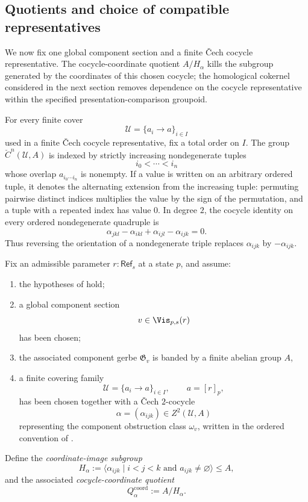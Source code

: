 
\subsection{Quotients and choice of compatible representatives}

We now fix one global component section and a finite \v{C}ech cocycle representative. The cocycle-coordinate quotient $A/H_\alpha$ kills the subgroup generated by the coordinates of this chosen cocycle; the homological cokernel considered in the next section removes dependence on the cocycle representative within the specified presentation-comparison groupoid.

\begin{definition}\label{def:ordered-cech-convention}
For every finite cover
\[
\mathcal U=\{a_i\to a\}_{i\in I}
\]
used in a finite \v{C}ech cocycle representative, fix a total order on $I$. The
group $\check C^n(\mathcal U,A)$ is indexed by strictly increasing
nondegenerate tuples
\[
i_0<\cdots<i_n
\]
whose overlap $a_{i_0\cdots i_n}$ is nonempty. If a value is written on an
arbitrary ordered tuple, it denotes the alternating extension from the
increasing tuple: permuting pairwise distinct indices multiplies the value
by the sign of the permutation, and a tuple with a repeated index has value
$0$. In degree $2$, the cocycle identity on every ordered nondegenerate
quadruple is
\[
\alpha_{jkl}-\alpha_{ikl}+\alpha_{ijl}-\alpha_{ijk}=0.
\]
Thus reversing the orientation of a nondegenerate triple replaces
$\alpha_{ijk}$ by $-\alpha_{ijk}$.
\end{definition}

\begin{definition}\label{def:finite-obstruction-presentation}
Fix an admissible parameter $r:\mathsf{Ref}_s$ at a state $p$, and assume:
\begin{enumerate}[label=(\roman*),nosep]
\item the hypotheses of
 hold;
\item a global component section
\[
v\in \Vis_{p,s}(r)
\]
has been chosen;
\item the associated component gerbe $\mathfrak G_v$ is banded by a finite abelian group $A$,
\item a finite covering family
\[
\mathcal U=\{a_i\to a\}_{i\in I},
\qquad
a=[r]_p,
\]
has been chosen together with a \v{C}ech $2$-cocycle
\[
\alpha=(\alpha_{ijk})\in Z^2(\mathcal U,A)
\]
representing the component obstruction class $\omega_v$, written in the ordered
convention of .
\end{enumerate}
Define the \emph{coordinate-image subgroup}
\[
H_\alpha:=\langle \alpha_{ijk}\mid i<j<k\text{ and }a_{ijk}\neq\varnothing\rangle\le A,
\]
and the associated \emph{cocycle-coordinate quotient}
\[
Q_{\alpha}^{\mathrm{coord}}:=A/H_\alpha.
\]
\end{definition}

